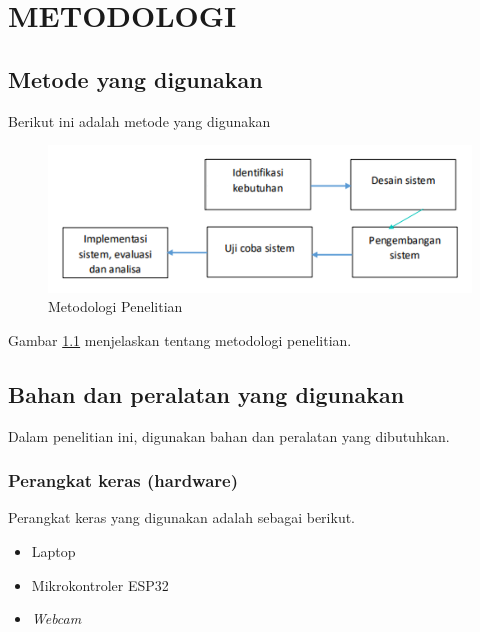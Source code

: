 \chapter{METODOLOGI}


\section{Metode yang digunakan}

Berikut ini adalah metode yang digunakan

\begin{figure} [H] \centering
  \includegraphics[scale=0.45]{gambar/Screenshot 2023-06-10 193529.png}
  \caption{Metodologi Penelitian}
  \label{fig:Metodologi}
\end{figure}

Gambar \ref{fig:Metodologi} menjelaskan tentang metodologi penelitian.

\section{Bahan dan peralatan yang digunakan}
Dalam penelitian ini, digunakan bahan dan peralatan yang dibutuhkan.
\subsection {Perangkat keras (hardware)}
Perangkat keras yang digunakan adalah sebagai berikut.
\begin{itemize}
 \item Laptop
 \item Mikrokontroler ESP32
 \item \emph{Webcam}
\end{itemize}

